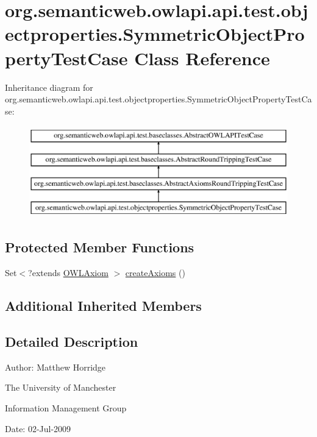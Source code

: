 \hypertarget{classorg_1_1semanticweb_1_1owlapi_1_1api_1_1test_1_1objectproperties_1_1_symmetric_object_property_test_case}{\section{org.\-semanticweb.\-owlapi.\-api.\-test.\-objectproperties.\-Symmetric\-Object\-Property\-Test\-Case Class Reference}
\label{classorg_1_1semanticweb_1_1owlapi_1_1api_1_1test_1_1objectproperties_1_1_symmetric_object_property_test_case}
}
Inheritance diagram for org.\-semanticweb.\-owlapi.\-api.\-test.\-objectproperties.\-Symmetric\-Object\-Property\-Test\-Case\-:\begin{figure}[H]
\begin{center}
\leavevmode
\includegraphics[height=4.000000cm]{classorg_1_1semanticweb_1_1owlapi_1_1api_1_1test_1_1objectproperties_1_1_symmetric_object_property_test_case}
\end{center}
\end{figure}
\subsection*{Protected Member Functions}
\begin{DoxyCompactItemize}
\item 
Set$<$?extends \hyperlink{interfaceorg_1_1semanticweb_1_1owlapi_1_1model_1_1_o_w_l_axiom}{O\-W\-L\-Axiom} $>$ \hyperlink{classorg_1_1semanticweb_1_1owlapi_1_1api_1_1test_1_1objectproperties_1_1_symmetric_object_property_test_case_ac27dd082529b23040840a679015cd0ea}{create\-Axioms} ()
\end{DoxyCompactItemize}
\subsection*{Additional Inherited Members}


\subsection{Detailed Description}
Author\-: Matthew Horridge\par
 The University of Manchester\par
 Information Management Group\par
 Date\-: 02-\/\-Jul-\/2009 

